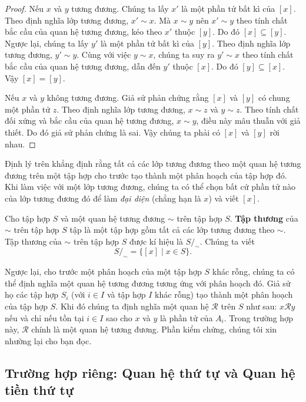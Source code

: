 \begin{proof}
    Nếu $x$ và $y$ tương đương. Chúng ta lấy $x'$ là một phần tử bất kì của $[x]$. Theo định nghĩa lớp tương đương, $x'\sim x$. Mà $x\sim y$ nên $x'\sim y$ theo tính chất bắc cầu của quan hệ tương đương, kéo theo $x'$ thuộc $[y]$. Do đó $[x]\subseteq [y]$. Ngược lại, chúng ta lấy $y'$ là một phần tử bất kì của $[y]$. Theo định nghĩa lớp tương đương, $y'\sim y$. Cùng với việc $y\sim x$, chúng ta suy ra $y'\sim x$ theo tính chất bắc cầu của quan hệ tương đương, dẫn đến $y'$ thuộc $[x]$. Do đó $[y]\subseteq [x]$. Vậy $[x] = [y]$.

    Nếu $x$ và $y$ không tương đương. Giả sử phản chứng rằng $[x]$ và $[y]$ có chung một phần tử $z$. Theo định nghĩa lớp tương đương, $x\sim z$ và $y\sim z$. Theo tính chất đối xứng và bắc cầu của quan hệ tương đương, $x\sim y$, điều này mâu thuẫn với giả thiết. Do đó giả sử phản chứng là sai. Vậy chúng ta phải có $[x]$ và $[y]$ rời nhau.
\end{proof}

Định lý trên khẳng định rằng tất cả các lớp tương đương theo một quan hệ tương đương trên một tập hợp cho trước tạo thành một phân hoạch của tập hợp đó. Khi làm việc với một lớp tương đương, chúng ta có thể chọn bất cứ phần tử nào của lớp tương đương đó để làm \textit{đại diện} (chẳng hạn là $x$) và viết $[x]$.

\begin{definition}
    Cho tập hợp $S$ và một quan hệ tương đương $\sim$ trên tập hợp $S$. \@\textbf{Tập thương} của $\sim$ trên tập hợp $S$ tập là một tập hợp gồm tất cả các lớp tương đương theo $\sim$. Tập thương của $\sim$ trên tập hợp $S$ được kí hiệu là $S/_{\sim}$. Chúng ta viết
    \[
        S/_{\sim} = \{ [x] \mid x\in S \}.
    \]
\end{definition}

Ngược lại, cho trước một phân hoạch của một tập hợp $S$ khác rỗng, chúng ta có thể định nghĩa một quan hệ tương đương tương ứng với phân hoạch đó. Giả sử họ các tập hợp $S_{i}$ (với $i\in I$ và tập hợp $I$ khác rỗng) tạo thành một phân hoạch của tập hợp $S$. Khi đó chúng ta định nghĩa một quan hệ $\mathscr{R}$ trên $S$ như sau: $x\mathscr{R}y$ nếu và chỉ nếu tồn tại $i\in I$ sao cho $x$ và $y$ là phần tử của $A_{i}$. Trong trường hợp này, $\mathscr{R}$ chính là một quan hệ tương đương. Phần kiểm chứng, chúng tôi xin nhường lại cho bạn đọc.

\subsection{Trường hợp riêng: Quan hệ thứ tự và Quan hệ tiền thứ tự}

